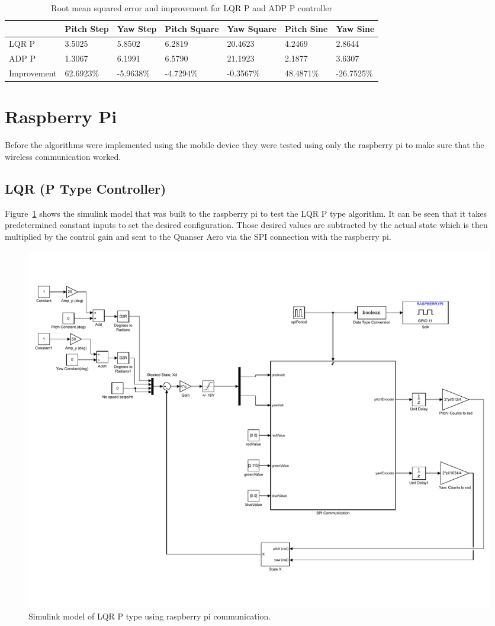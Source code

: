 \begin{table}
    \centering
    \begin{tabular}{l|l|l|l|l|l|l}
        \toprule
        \textbf{} & \textbf{Pitch Step} & \textbf{Yaw Step} & \textbf{Pitch Square} & \textbf{Yaw Square} & \textbf{Pitch Sine} & \textbf{Yaw Sine}\\
        \toprule
        LQR P & 3.5025 & 5.8502 & 6.2819 & 20.4623 & 4.2469 & 2.8644\\
        ADP P & 1.3067 & 6.1991 & 6.5790 & 21.1923 & 2.1877 & 3.6307\\
        Improvement & 62.6923\% & -5.9638\%  & -4.7294\% & -0.3567\% & 48.4871\% & -26.7525\% \\
    \end{tabular}
    \caption{Root mean squared error and improvement for LQR P and ADP P controller}
    \label{tab:RMSE_LQR_ADP}
\end{table}

\section{Raspberry Pi}
Before the algorithms were implemented using the mobile device they were tested using only the raspberry pi to make sure that the wireless communication worked.
\subsection{LQR (P Type Controller)}
Figure~\ref{fig:LQR_RaspPi} shows the simulink model that was built to the raspberry pi to test the LQR P type algorithm.  It can be seen that it takes predetermined constant inputs to set the desired configuration.  Those desired values are subtracted by the actual state which is then multiplied by the control gain and sent to the Quanser Aero via the SPI connection with the raspberry pi.
\begin{figure}[!htbp]
    \centering
    \includegraphics[width=.62\textwidth,keepaspectratio=true]{figs/img/LQR_RaspPi}
    \caption{Simulink model of LQR P type using raspberry pi communication.}
    \label{fig:LQR_RaspPi}
\end{figure}


